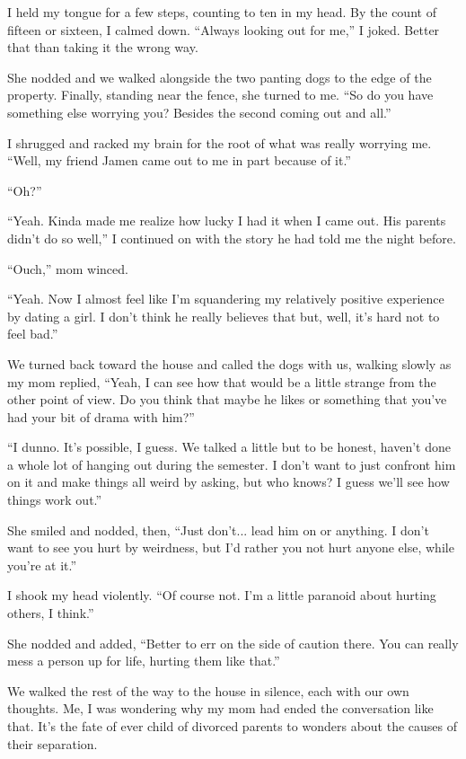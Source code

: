 I held my tongue for a few steps, counting to ten in my head.  By the count of fifteen or sixteen, I calmed down.  ``Always looking out for me,'' I joked.  Better that than taking it the wrong way.

She nodded and we walked alongside the two panting dogs to the edge of the property.  Finally, standing near the fence, she turned to me.  ``So do you have something else worrying you?  Besides the second coming out and all.''

I shrugged and racked my brain for the root of what was really worrying me.  ``Well, my friend Jamen came out to me in part because of it.''

``Oh?''

``Yeah.  Kinda made me realize how lucky I had it when I came out.  His parents didn't do so well,''  I continued on with the story he had told me the night before.

``Ouch,'' mom winced.

``Yeah.  Now I almost feel like I'm squandering my relatively positive experience by dating a girl.  I don't think he really believes that but, well, it's hard not to feel bad.''


We turned back toward the house and called the dogs with us, walking slowly as my mom replied, ``Yeah, I can see how that would be a little strange from the other point of view.  Do you think that maybe he likes or something that you've had your bit of drama with him?''

``I dunno.  It's possible, I guess.  We talked a little but to be honest, haven't done a whole lot of hanging out during the semester.  I don't want to just confront him on it and make things all weird by asking, but who knows?  I guess we'll see how things work out.''

She smiled and nodded, then, ``Just don't... lead him on or anything.  I don't want to see you hurt by weirdness, but I'd rather you not hurt anyone else, while you're at it.''

I shook my head violently.  ``Of course not.  I'm a little paranoid about hurting others, I think.''

She nodded and added, ``Better to err on the side of caution there.  You can really mess a person up for life, hurting them like that.''

We walked the rest of the way to the house in silence, each with our own thoughts.  Me, I was wondering why my mom had ended the conversation like that.  It's the fate of ever child of divorced parents to wonders about the causes of their separation.
